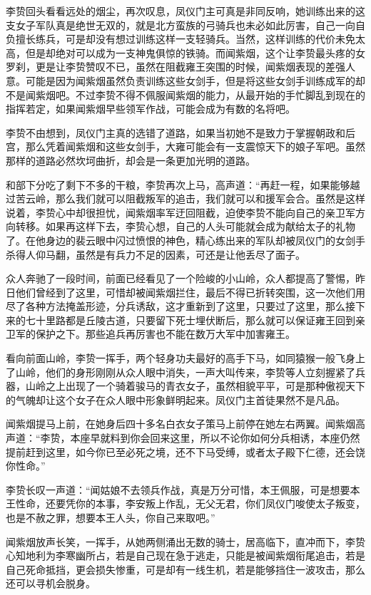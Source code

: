 李贽回头看看远处的烟尘，再次叹息，凤仪门主可真是非同反响，她训练出来的这支女子军队真是绝世无双的，就是北方蛮族的弓骑兵也未必如此厉害，自己一向自负擅长练兵，可是却没有想过训练这样一支轻骑兵。当然，这样训练的代价未免太高，但是却绝对可以成为一支神鬼俱惊的铁骑。而闻紫烟，这个让李贽最头疼的女罗刹，更是让李贽赞叹不已，虽然在阻截雍王突围的时候，闻紫烟表现的差强人意。可能是因为闻紫烟虽然负责训练这些女剑手，但是将这些女剑手训练成军的却不是闻紫烟吧。不过李贽不得不佩服闻紫烟的能力，从最开始的手忙脚乱到现在的指挥若定，如果闻紫烟早些领军作战，可能会成为有数的名将吧。

李贽不由想到，凤仪门主真的选错了道路，如果当初她不是致力于掌握朝政和后宫，那么凭着闻紫烟和这些女剑手，大雍可能会有一支震惊天下的娘子军吧。虽然那样的道路必然坎坷曲折，却会是一条更加光明的道路。

和部下分吃了剩下不多的干粮，李贽再次上马，高声道：“再赶一程，如果能够越过苦云岭，那么我们就可以阻截叛军的追击，我们就可以和援军会合。虽然是这样说着，李贽心中却很担忧，闻紫烟率军迂回阻截，迫使李贽不能向自己的亲卫军方向转移。如果再这样下去，李贽心想，自己的人头可能就会成为献给太子的礼物了。在他身边的裴云眼中闪过愤恨的神色，精心练出来的军队却被凤仪门的女剑手杀得人仰马翻，虽然是有兵力不足的因素，可还是让他丢尽了面子。

众人奔驰了一段时间，前面已经看见了一个险峻的小山岭，众人都提高了警惕，昨日他们曾经到了这里，可惜却被闻紫烟拦住，最后不得已折转突围，这一次他们用尽了各种方法掩盖形迹，分兵诱敌，这才重新到了这里，只要过了这里，那么接下来的七十里路都是丘陵古道，只要留下死士埋伏断后，那么就可以保证雍王回到亲卫军的保护之下。那些追兵再厉害也不能在数万大军中加害雍王。

看向前面山岭，李贽一挥手，两个轻身功夫最好的高手下马，如同猿猴一般飞身上了山岭，他们的身形刚刚从众人眼中消失，一声大叫传来，李贽等人立刻握紧了兵器，山岭之上出现了一个骑着骏马的青衣女子，虽然相貌平平，可是那种傲视天下的气魄却让这个女子在众人眼中形象鲜明起来。凤仪门主首徒果然不是凡品。

闻紫烟提马上前，在她身后四十多名白衣女子策马上前停在她左右两翼。闻紫烟高声道：“李贽，本座早就料到你会回来这里，所以不论你如何分兵相诱，本座仍然提前赶到这里，如今你已至必死之境，还不下马受缚，或者太子殿下仁德，还会饶你性命。”

李贽长叹一声道：“闻姑娘不去领兵作战，真是万分可惜，本王佩服，可是想要本王性命，还要凭你的本事，李安叛上作乱，无父无君，你们凤仪门唆使太子叛变，也是不赦之罪，想要本王人头，你自己来取吧。”

闻紫烟放声长笑，一挥手，从她两侧涌出无数的骑士，居高临下，直冲而下，李贽心知地利为李寒幽所占，若是自己现在急于逃走，只能是被闻紫烟衔尾追击，若是自己死命抵挡，更会损失惨重，可是却有一线生机，若是能够挡住一波攻击，那么还可以寻机会脱身。

